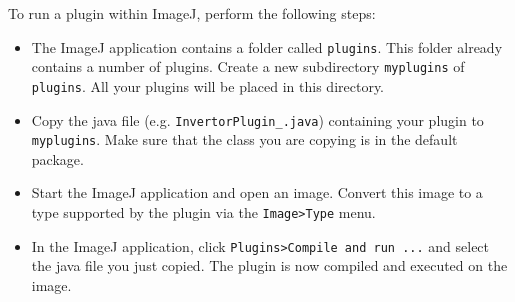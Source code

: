 \documentclass{book}
\begin{document}
To run a plugin within ImageJ, perform the following steps:
\begin{itemize}
  \item The ImageJ application contains a folder called \texttt{plugins}. This folder already contains a number of plugins. Create a new subdirectory \texttt{myplugins} of \texttt{plugins}. All your plugins will be placed in this directory.
  \item Copy the java file (e.g. \texttt{InvertorPlugin\_.java}) containing your plugin to \texttt{myplugins}. Make sure that the class you are copying is in the default package.
  \item Start the ImageJ application and open an image. Convert this image to a type supported by the plugin via the \texttt{Image>Type} menu.
  \item In the ImageJ application, click \texttt{Plugins>Compile and run ...} and select the java file you just copied. The plugin is now compiled and executed on the image. 
\end{itemize}
\end{document}
